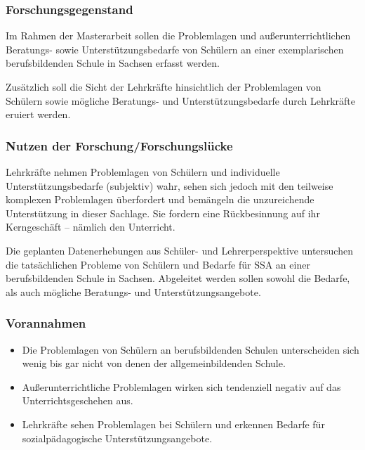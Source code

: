 \subsubsection{Forschungsgegenstand}
\label{sec:Forschungsgegenstand}

Im Rahmen der Masterarbeit sollen die Problemlagen und außerunterrichtlichen Beratungs- sowie Unterstützungsbedarfe von Schülern an einer exemplarischen berufsbildenden Schule in Sachsen erfasst werden.

Zusätzlich soll die Sicht der Lehrkräfte hinsichtlich der Problemlagen von Schülern sowie mögliche Beratungs- und Unterstützungsbedarfe durch Lehrkräfte eruiert werden.

\subsubsection{Nutzen der Forschung/Forschungslücke}
\label{sec:NutzenDerForschungForschungslücke}

Lehrkräfte nehmen Problemlagen von Schülern und individuelle Unterstützungsbedarfe (subjektiv) wahr, sehen sich jedoch mit den teilweise komplexen Problemlagen überfordert und bemängeln die unzureichende Unterstützung in dieser Sachlage. Sie fordern eine Rückbesinnung auf ihr Kerngeschäft -- nämlich den Unterricht.

Die geplanten Datenerhebungen aus Schüler- und Lehrerperspektive untersuchen die tatsächlichen Probleme von Schülern und Bedarfe für SSA an einer berufsbildenden Schule in Sachsen. Abgeleitet werden sollen sowohl die Bedarfe, als auch mögliche Beratungs- und Unterstützungsangebote.

\subsubsection{Vorannahmen}
\label{sec:Vorannahmen}

\begin{itemize}
	\item Die Problemlagen von Schülern an berufsbildenden Schulen unterscheiden sich wenig bis gar nicht von denen der allgemeinbildenden Schule.
	\item Außerunterrichtliche Problemlagen wirken sich tendenziell negativ auf das Unterrichtsgeschehen aus.
	\item Lehrkräfte sehen Problemlagen bei Schülern und erkennen Bedarfe für sozialpädagogische Unterstützungsangebote. 
\end{itemize}

